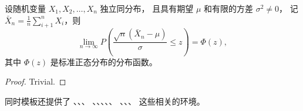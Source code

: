 \begin{theorem}
	设随机变量 $X_1, X_2, \dots, X_n$ 独立同分布， 且具有期望 $\mu$ 和有限的方差 $\sigma^2 \ne 0$，
	记 $\bar{X}_n = \frac{1}{n} \sum_{i+1}^n X_i$，则
	\begin{equation}
		\lim_{n \to \infty} P \left(\frac{\sqrt{n} \left( \bar{X}_n - \mu \right)}{\sigma} \le z \right) = \Phi(z),
	\end{equation}
	其中 $\Phi(z)$ 是标准正态分布的分布函数。
\end{theorem}
\begin{proof}
	Trivial.
\end{proof}

同时模板还提供了 、、、
、、、、、
、、、 这些相关的环境。

\fi